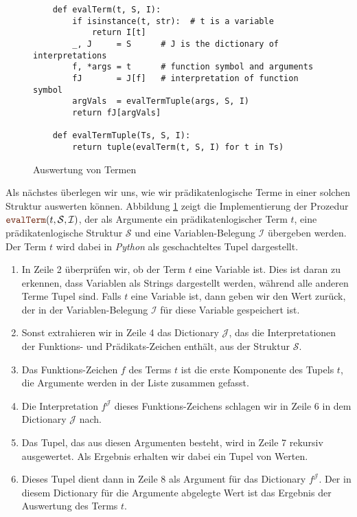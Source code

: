 \begin{figure}[!ht]
\centering
\begin{verbatim}
    def evalTerm(t, S, I):
        if isinstance(t, str):  # t is a variable
            return I[t]
        _, J     = S      # J is the dictionary of interpretations
        f, *args = t      # function symbol and arguments
        fJ       = J[f]   # interpretation of function symbol
        argVals  = evalTermTuple(args, S, I)
        return fJ[argVals]
        
    def evalTermTuple(Ts, S, I):
        return tuple(evalTerm(t, S, I) for t in Ts)    
\end{verbatim}
\vspace*{-0.3cm}
\caption{Auswertung von Termen}
\label{fig:evalTerm.ipynb}
\end{figure}


Als nächstes überlegen wir uns, wie wir prädikatenlogische Terme in einer solchen Struktur
auswerten können.  Abbildung \ref{fig:evalTerm.ipynb} zeigt die Implementierung der Prozedur
$\mytt{evalTerm}(t, \mathcal{S}, \mathcal{I})$, der als Argumente ein prädikatenlogischer Term $t$, eine
prädikatenlogische Struktur $\mathcal{S}$ und eine Variablen-Belegung $\mathcal{I}$ übergeben werden.  Der Term
$t$ wird dabei in \textsl{Python} als geschachteltes Tupel dargestellt.
\begin{enumerate}
\item In Zeile 2 überprüfen wir, ob der Term $t$ eine Variable ist.  Dies ist daran zu erkennen, dass Variablen
      als Strings dargestellt werden, während alle anderen Terme Tupel sind.  Falls $t$ eine Variable ist, dann 
      geben wir den Wert zurück, der in der Variablen-Belegung $\mathcal{I}$ für diese Variable gespeichert
      ist.
\item Sonst extrahieren wir in Zeile 4 das Dictionary $\mathcal{J}$, das die Interpretationen der Funktions- und
      Prädikats-Zeichen enthält, aus der Struktur $\mathcal{S}$.
\item Das Funktions-Zeichen $f$ des Terms $t$ ist die erste Komponente des Tupels $t$,
      die Argumente werden in der Liste  zusammen gefasst.
\item Die Interpretation $f^\mathcal{J}$ dieses Funktions-Zeichens schlagen wir in Zeile 6 in dem Dictionary
      $\mathcal{J}$ nach.
\item Das Tupel, das aus diesen Argumenten besteht, wird in Zeile 7 rekursiv ausgewertet.
      Als Ergebnis erhalten wir dabei ein Tupel von Werten.
\item Dieses Tupel dient dann in Zeile 8 als Argument für das Dictionary $f^\mathcal{J}$.  Der in diesem
      Dictionary für die Argumente abgelegte Wert ist das Ergebnis der Auswertung des Terms $t$.
\end{enumerate}

